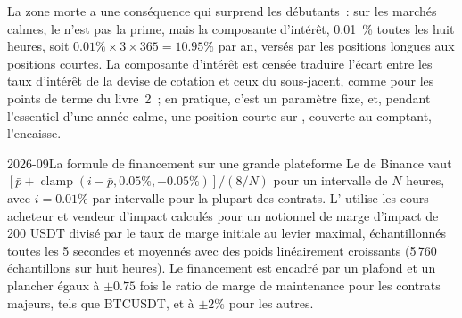 La zone morte a une conséquence qui surprend les débutants~: sur les marchés calmes, le  n'est pas la prime, mais
la composante d'intérêt, 0.01~\% toutes les huit heures, soit $0.01\% \times 3 \times 365 = 10.95\%$ par an, versés par les positions longues aux positions courtes.
La composante d'intérêt est censée traduire l'écart entre les taux d'intérêt de la devise de cotation et ceux du sous-jacent,
comme pour les points de terme du livre~2~; en pratique, c'est un paramètre fixe,
et, pendant l'essentiel d'une année calme, une position courte sur , couverte au comptant, l'encaisse.

\begin{dated}{2026-09}{La formule de financement sur une grande plateforme}\label{dat:m3:perpetual-futures:formula}
Le  de Binance vaut $[\bar p + \operatorname{clamp}(i - \bar p, 0.05\%, -0.05\%)]/(8/N)$ pour un
intervalle de $N$ heures, avec $i = 0.01\%$ par intervalle pour la plupart des contrats. L' utilise les cours acheteur et vendeur d'impact calculés pour
un notionnel de marge d'impact de 200 USDT divisé par le taux de marge initiale au levier maximal, échantillonnés toutes les 5 secondes
et moyennés avec des poids linéairement croissants (5\,760 échantillons sur huit heures). Le financement est encadré par un plafond et un plancher égaux à
$\pm 0.75$ fois le ratio de marge de maintenance pour les contrats majeurs, tels que BTCUSDT, et à $\pm 2\%$ pour les autres.
\end{dated}

